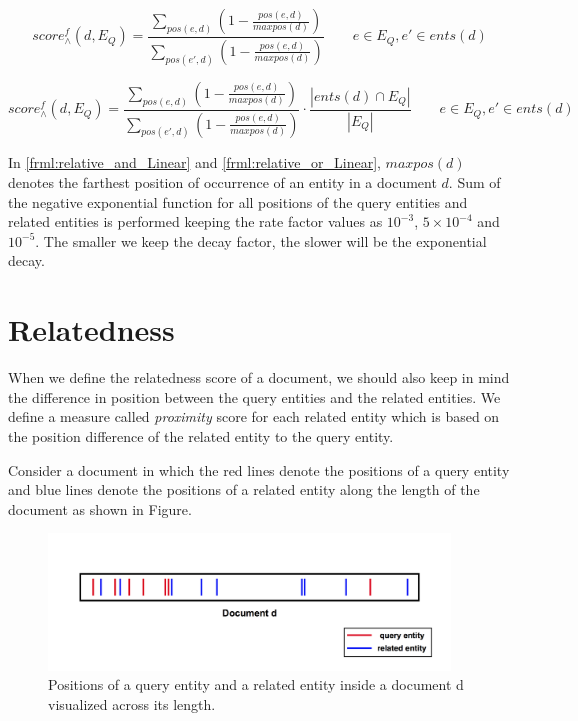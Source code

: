 \documentclass[10pt,a4paper]{article} %
\begin{document}
    \begin{equation}
    \label{frml:relative_and_Linear}
    score^{f}_{\wedge}(d, E_Q) = \frac{\sum_{pos(e,d)}{(1-\frac{pos(e,d)}{maxpos(d)})}}{\sum_{pos(e',d)}{(1-\frac{pos(e,d)}{maxpos(d)})}} \qquad e\in E_Q, e'\in ents(d)
    \end{equation}
    
    \begin{equation}
    \label{frml:relative_or_Linear}
    score^{f}_{\wedge}(d, E_Q) = \frac{\sum_{pos(e,d)}{(1-\frac{pos(e,d)}{maxpos(d)})}}{\sum_{pos(e',d)}{(1-\frac{pos(e,d)}{maxpos(d)})}} \cdot \frac{|ents(d) \cap E_Q|}{|E_Q|} \qquad e\in E_Q, e'\in ents(d)
    \end{equation}
    
    \noindent In \ref{frml:relative_and_Linear} and \ref{frml:relative_or_Linear}, $maxpos(d)$ denotes the farthest position of occurrence of an entity in a document $d$. 
    Sum of the negative exponential function for all positions of the query entities and related entities is performed
    keeping the rate factor values as $10^{-3}$, $5 \times 10^{-4}$ and $10^{-5}$. 
    The smaller we keep the decay factor, the slower will be the exponential decay. 
    
    \section{Relatedness}
    
    When we define the relatedness score of a document, we should also keep in mind the difference in position 
    between the query entities and the related entities. We define a measure called {\em proximity} score for 
    each related entity which is based on the position difference of the related entity to the query entity.
    
    \noindent Consider a document in which the red lines denote the positions of a query entity and 
    blue lines denote the positions of a related entity along the length of the document
    as shown in Figure.
    
    \begin{figure}[ht]
	\centering
	\includegraphics[width=0.95\textwidth]{entity_positions_in_doc.jpg}
	\caption{Positions of a query entity and a related entity inside a document d visualized across its length.}
	\label{fig:entity_positions_in_doc}
    \end{figure}
\end{document}
